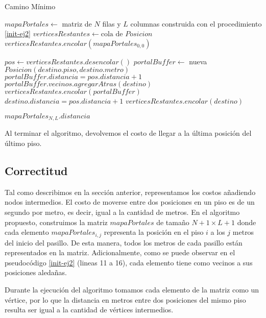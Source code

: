 \begin{algorithm}[H]
\caption{Camino Mínimo}\label{alg-ej2}
\begin{algorithmic}[4]
\State $mapaPortales \gets$ matriz de $N$ filas y $L$ columnas construida con el procedimiento \ref{init-ej2}
\State $\textit{verticesRestantes} \gets \text{cola de }Posicion$
\State $\textit{verticesRestantes}.encolar(mapaPortales_{0,0})$

\State $pos \gets verticesRestantes.desencolar()$
\State $portalBuffer \gets$ nueva $Posicion(destino.piso, destino.metro)$
\State $portalBuffer.distancia = pos.distancia + 1$
\State $portalBuffer.vecinos.agregarAtras(destino)$
\State $verticesRestantes.encolar(portalBuffer)$
\Else
\State $destino.distancia = pos.distancia + 1$
\State $verticesRestantes.encolar(destino)$
\EndIf
\EndIf
\EndFor
\EndWhile

\Return $mapaPortales_{N,L}.distancia$


\EndProcedure
\end{algorithmic}
\end{algorithm}


Al terminar el algoritmo, devolvemos el costo de llegar a la última posición del último piso.




\subsection{Correctitud}

Tal como describimos en la sección anterior, representamos los costos añadiendo nodos intermedios. El costo de moverse entre dos posiciones en un piso es de un segundo por metro, es decir, igual a la cantidad de metros. 
En el algoritmo propuesto, construimos la matriz $mapaPortales$ de tamaño $N+1 \times L+1$ donde cada elemento $mapaPortales_{i,j}$ representa la posición en el piso $i$ a los $j$ metros del inicio del pasillo. 
De esta manera, todos los metros de cada pasillo están representados en la matriz. 
Adicionalmente, como se puede observar en el pseudocódigo \ref{init-ej2} (lineas 11 a 16), cada elemento tiene como vecinos a sus posiciones aledañas.

Durante la ejecución del algoritmo tomamos cada elemento de la matriz como un vértice, por lo que la distancia en metros entre dos posiciones del mismo piso resulta ser igual a la cantidad de vértices intermedios.


